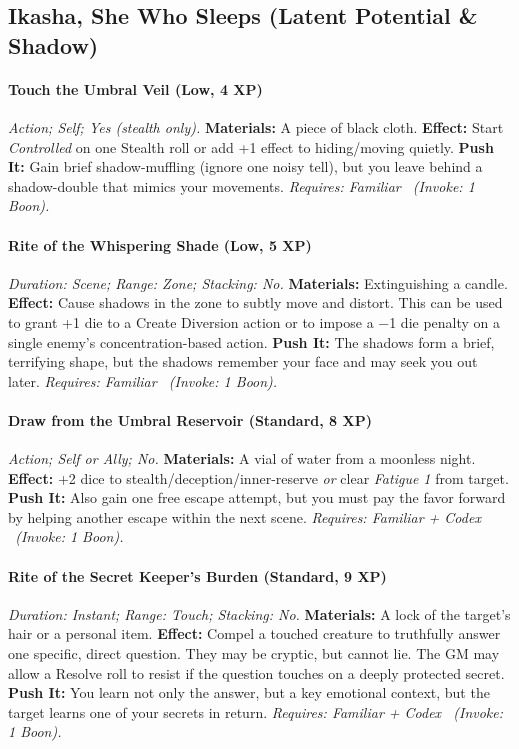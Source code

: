 \subsection{Ikasha, She Who Sleeps (Latent Potential \& Shadow)}
\paragraph{Touch the Umbral Veil (Low, 4 XP)} \emph{Action; Self; Yes (stealth only).}
\textbf{Materials:} A piece of black cloth.
\textbf{Effect:} Start \emph{Controlled} on one Stealth roll or add +1 effect to hiding/moving quietly.
\textbf{Push It:} Gain brief shadow-muffling (ignore one noisy tell), but you leave behind a shadow-double that mimics your movements.
\emph{Requires: Familiar \ (\textit{Invoke:} 1 Boon).}
\paragraph{Rite of the Whispering Shade (Low, 5 XP)} \emph{Duration: Scene; Range: Zone; Stacking: No.}
\textbf{Materials:} Extinguishing a candle.
\textbf{Effect:} Cause shadows in the zone to subtly move and distort. This can be used to grant +1 die to a Create Diversion action or to impose a −1 die penalty on a single enemy's concentration-based action.
\textbf{Push It:} The shadows form a brief, terrifying shape, but the shadows remember your face and may seek you out later.
\emph{Requires: Familiar \ (\textit{Invoke:} 1 Boon).}
\paragraph{Draw from the Umbral Reservoir (Standard, 8 XP)} \emph{Action; Self or Ally; No.}
\textbf{Materials:} A vial of water from a moonless night.
\textbf{Effect:} +2 dice to stealth/deception/inner-reserve \emph{or} clear \emph{Fatigue 1} from target.
\textbf{Push It:} Also gain one free escape attempt, but you must pay the favor forward by helping another escape within the next scene.
\emph{Requires: Familiar + Codex \ (\textit{Invoke:} 1 Boon).}
\paragraph{Rite of the Secret Keeper's Burden (Standard, 9 XP)} \emph{Duration: Instant; Range: Touch; Stacking: No.}
\textbf{Materials:} A lock of the target's hair or a personal item.
\textbf{Effect:} Compel a touched creature to truthfully answer one specific, direct question. They may be cryptic, but cannot lie. The GM may allow a Resolve roll to resist if the question touches on a deeply protected secret.
\textbf{Push It:} You learn not only the answer, but a key emotional context, but the target learns one of your secrets in return.
\emph{Requires: Familiar + Codex \ (\textit{Invoke:} 1 Boon).}
